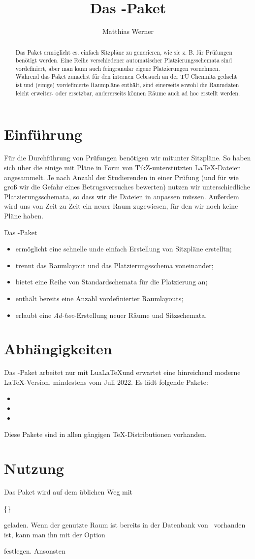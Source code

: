 \documentclass{cnltx-doc}
\author{Matthias Werner}
\title{Das \pkg*{\packagename}-Paket}
\let\thepkg\packagename
\begin{document}
\maketitle

\begin{abstract}
Das Paket \thepkg ermöglicht es, einfach Sitzpläne zu
generieren, wie sie z. B. für Prüfungen benötigt werden. Eine Reihe
verschiedener automatischer Platzierungsschemata sind vordefiniert, 
aber man kann auch feingranular eigene Platzierungen vornehmen.
Während das Paket zunächst für den internen
Gebrauch an der TU Chemnitz gedacht ist und
(einige) vordefinierte Raumpläne enthält, sind
einerseits sowohl die Raumdaten leicht erweiter-
oder ersetzbar, andererseits können Räume auch
ad hoc erstellt werden.
\end{abstract}
\tableofcontents

\section{Einführung}
Für die Durchführung von Prüfungen benötigen wir mitunter Sitzpläne.
So haben sich über die einige mit Pläne  in Form von TikZ-unterstützten
\LaTeX-Dateien angesammelt. 
Je nach Anzahl der Studierenden in einer Prüfung (und für wie groß wir die
Gefahr eines Betrugsversuches bewerten) nutzen wir unterschiedliche
Platzierungsschemata, so dass wir die Dateien in anpassen müssen.
Außerdem wird uns von Zeit zu Zeit ein neuer Raum zugewiesen, für den wir noch
keine Pläne haben.

Das \thepkg-Paket 
\begin{itemize}
  \item ermöglicht eine schnelle unde einfach Erstellung von Sitzpläne erstelltn;
  \item trennt das Raumlayout und das Platzierungsschema voneinander;
  \item bietet eine Reihe von Standardschemata für die Platzierung an;
  \item enthält bereits eine Anzahl vordefinierter Raumlayouts;
  \item erlaubt eine \emph{Ad-hoc}-Erstellung neuer Räume und Sitzschemata.
\end{itemize}

\section{Abhängigkeiten}
Das \thepkg-Paket arbeitet nur mit Lua\LaTeX und erwartet eine hinreichend
moderne \LaTeX-Version, mindestens vom Juli 2022.
Es lädt folgende Pakete:
\begin{itemize}
  \item {} 
  \item {}
  \item {}
\end{itemize}
Diese Pakete sind in allen gängigen \TeX-Distributionen vorhanden.

\section{Nutzung}
Das Paket wird auf dem üblichen Weg mit

\centerline{\{\thepkg\}}

geladen.
Wenn der genutzte Raum ist bereits in der Datenbank von \thepkg\ vorhanden ist,
kann man ihn mit der Option

festlegen.
Ansonsten
\end{document}
